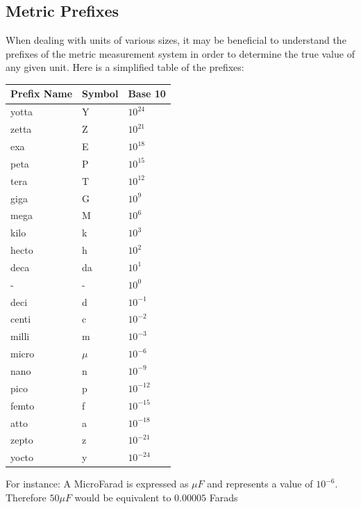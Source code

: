 \documentclass[11pt,a4paper]{article}
\begin{document}
\subsection{Metric Prefixes}
When dealing with units of various sizes, it may be beneficial to understand the prefixes of the metric measurement system in order to determine the true value of any given unit. Here is a simplified table of the prefixes:
\begin{center}
\begin{tabular}{| l | l | l |}
  \hline
Prefix Name & Symbol & Base 10 \\
  \hline
yotta & Y & $10^{24}$ \\
  zetta & Z & $10^{21}$ \\
  exa & E & $10^{18}$ \\
peta & P & $10^{15}$ \\
tera & T & $10^{12}$ \\
giga & G & $10^9$ \\
mega & M & $10^6$ \\
kilo & k & $10^3$ \\
hecto & h & $10^2$ \\
deca & da & $10^1$ \\
- & - & $10^0$ \\
deci & d & $10^{-1}$ \\
centi & c & $10^{-2}$ \\
milli & m & $10^{-3}$ \\
micro & $\mu$ & $10^{-6}$ \\
nano & n & $10^{-9}$ \\
pico & p & $10^{-12}$ \\
femto & f & $10^{-15}$ \\
atto & a & $10^{-18}$ \\
zepto & z & $10^{-21}$ \\
yocto & y & $10^{-24}$ \\
  \hline
\end{tabular}
\end{center}

For instance: A MicroFarad is expressed as $\mu F$ and represents a value of $10^{-6}$. Therefore $50 \mu F$ would be equivalent to $0.00005$ Farads
\end{document}
